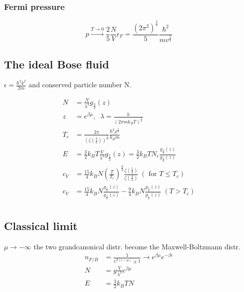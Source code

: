\subsubsection*{Fermi pressure}

\begin{equation*}
    p \overset{T\rightarrow 0}{\rightarrow}\frac{2}{5} \frac{N}{V}\epsilon_F = \frac{(2\pi^2)^{\frac{2}{3}}}{5} \frac{\hbar^2}{mv^{\frac{5}{3}}}
\end{equation*}

\subsection*{The ideal Bose fluid}
$\epsilon = \frac{\hbar^2 k^2}{2m}$ and conserved particle number N.

\begin{equation*}
    \begin{aligned}
        N &= \frac{N}{\lambda^3} g_{\frac{3}{2}} (z) \\
        z &= e^{\beta \mu}, \;\; \lambda = \frac{h}{(2 \pi m k_B T)^{\frac{1}{2}}} \\
        T_c &= \frac{2 \pi}{\left(\zeta\left(\frac{3}{2}\right)\right)^{\frac{3}{2}}} \frac{\hbar^2 \rho^{\frac{2}{3}}}{k_B m} \\
        E &= \frac{3}{2} k_B T \frac{V}{\lambda^3} g_{\frac{5}{2}}(z) = \frac{3}{2} k_B T N_e \frac{g_{\frac{5}{2}}(z)}{g_{\frac{3}{2}}(z)} \\
        c_V &= \frac{15}{4} k_B N \left(\frac{T}{T_c}\right)^{\frac{3}{2}} \frac{\zeta\left(\frac{5}{2}\right)}{\zeta\left(\frac{3}{2}\right)} \;( \text{ for } T \leq T_c) \\
        c_V &= \frac{15}{4} k_B N \frac{g_{\frac{5}{2}}(z)}{g_{\frac{3}{2}}(z)} - \frac{9}{4}k_B N \frac{g_{\frac{3}{2}}(z)}{g_{\frac{1}{2}}(z)}  \;( T > T_c) \\
    \end{aligned}
\end{equation*}

\subsection*{Classical limit}
$\mu \rightarrow - \infty$ the two grandcanonical distr. become the Maxwell-Boltzmann distr.
\begin{equation*}
    \begin{aligned}
        n_{F/B} &= \frac{1}{e^{\beta(\epsilon-\mu)}\pm1} \rightarrow e^{\beta \mu} e^{-\beta \epsilon} \\
        N &= g \frac{V}{\lambda^3} e^{\beta \mu} \\
        E &= \frac{3}{2} k_B T N
    \end{aligned}
\end{equation*}